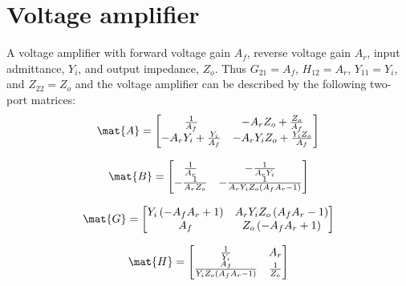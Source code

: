 \documentclass[a4paper, 12pt]{article}
\begin{document}




\section{Voltage amplifier}

A voltage amplifier with forward voltage gain $A_f$, reverse voltage
gain $A_r$, input admittance, $Y_i$, and output impedance, $Z_o$.
Thus $G_{21} = A_f$, $H_{12} = A_r$, $Y_{11} = Y_i$, and $Z_{22} =
Z_o$ and the voltage amplifier can be described by the following
two-port matrices:
%
\begin{equation}
\mat{A} = \left[\begin{matrix}\frac{1}{A_{f}} & - A_{r} Z_{o} + \frac{Z_{o}}{A_{f}}\\- A_{r} Y_{i} + \frac{Y_{i}}{A_{f}} & - A_{r} Y_{i} Z_{o} + \frac{Y_{i} Z_{o}}{A_{f}}\end{matrix}\right]
\end{equation}

\begin{equation}
\mat{B} = \left[\begin{matrix}\frac{1}{A_{r}} & - \frac{1}{A_{r} Y_{i}}\\- \frac{1}{A_{r} Z_{o}} & - \frac{1}{A_{r} Y_{i} Z_{o} \left(A_{f} A_{r} - 1\right)}\end{matrix}\right]
\end{equation}

\begin{equation}
\mat{G} = \left[\begin{matrix}Y_{i} \left(- A_{f} A_{r} + 1\right) & A_{r} Y_{i} Z_{o} \left(A_{f} A_{r} - 1\right)\\A_{f} & Z_{o} \left(- A_{f} A_{r} + 1\right)\end{matrix}\right]
\end{equation}

\begin{equation}
\mat{H} = \left[\begin{matrix}\frac{1}{Y_{i}} & A_{r}\\\frac{A_{f}}{Y_{i} Z_{o} \left(A_{f} A_{r} - 1\right)} & \frac{1}{Z_{o}}\end{matrix}\right]
\end{equation}
\end{document}
